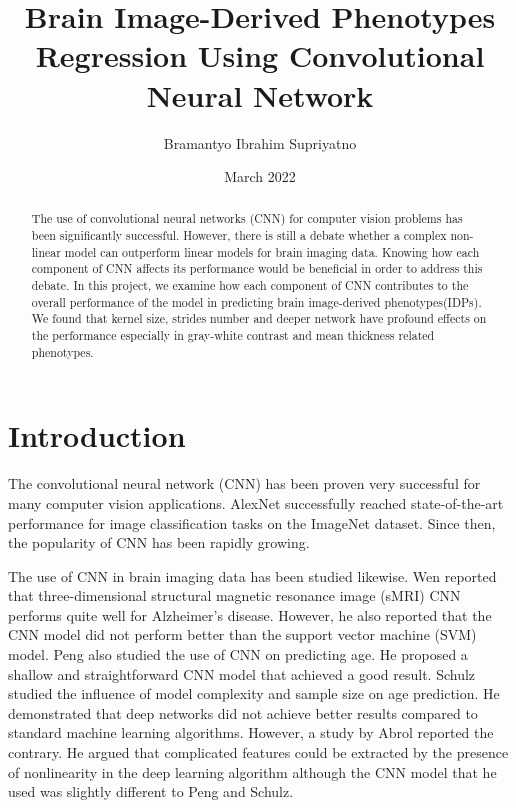 \documentclass{article}
\title{Brain Image-Derived Phenotypes Regression Using Convolutional Neural Network}
\author{Bramantyo Ibrahim Supriyatno}
\date{March 2022}
\begin{document}
    \maketitle
    \begin{abstract}
        The use of convolutional neural networks (CNN) for computer vision problems has been significantly successful. 
        However, there is still a debate whether a complex non-linear model can outperform linear models for brain imaging data. 
        Knowing how each component of CNN affects its performance would be beneficial in order to address this debate. 
        In this project, we examine how each component of CNN contributes to the overall performance of the model in predicting brain image-derived phenotypes(IDPs). 
        We found that kernel size, strides number and deeper network have profound effects on the performance especially in gray-white contrast and mean thickness related phenotypes. 
    \end{abstract}
    
    \section*{Introduction}
    The convolutional neural network (CNN) has been proven very successful for many computer vision applications. 
    AlexNet\cite{alexnet} successfully reached state-of-the-art performance for image classification tasks on the ImageNet dataset. 
    Since then, the popularity of CNN has been rapidly growing.
    
    The use of CNN in brain imaging data has been studied likewise. 
    Wen\cite{wen} reported that three-dimensional structural magnetic resonance image (sMRI) CNN performs quite well for Alzheimer's disease. 
    However, he also reported that the CNN model did not perform better than the support vector machine (SVM) model. 
    Peng\cite{peng} also studied the use of CNN on predicting age. He proposed a shallow and straightforward CNN model that achieved a good result. 
    Schulz\cite{schulz} studied the influence of model complexity and sample size on age prediction. 
    He demonstrated that deep networks did not achieve better results compared to standard machine learning algorithms. 
    However, a study by Abrol\cite{abrol} reported the contrary. 
    He argued that complicated features could be extracted by the presence of nonlinearity in the deep learning algorithm  
    although the CNN model that he used was slightly different to Peng and Schulz. 
        
\end{document}
